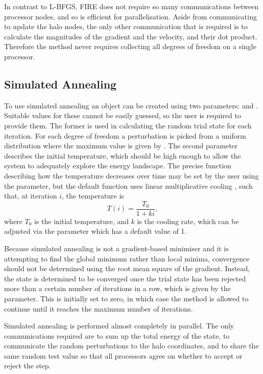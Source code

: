 In contrast to L-BFGS, FIRE does not require so many communications between processor nodes, and so is efficient for parallelisation.
Aside from communicating to update the halo nodes, the only other communication that is required is to calculate the magnitudes of the gradient and the velocity, and their dot product.
Therefore the method never requires collecting all degrees of freedom on a single processor.

\subsection{Simulated Annealing}
To use simulated annealing an  object can be created using two parameters:  and .
Suitable values for these cannot be easily guessed, so the user is required to provide them.
The former is used in calculating the random trial state for each iteration.
For each degree of freedom a perturbation is picked from a uniform distribution where the maximum value is given by .
The second parameter  describes the initial temperature, which should be high enough to allow the system to adequately explore the energy landscape.
The precise function describing how the temperature decreases over time may be set by the user using the  parameter, but the default function uses linear multiplicative cooling \cite{Junn2017}, such that, at iteration $i$, the temperature is
\begin{equation}
  T(i) = \frac{T_0}{1 + ki},
\end{equation}
where $T_0$ is the initial temperature, and $k$ is the cooling rate, which can be adjusted via the parameter  which has a default value of 1.

Because simulated annealing is not a gradient-based minimiser and it is attempting to find the global minimum rather than local minima, convergence should not be determined using the root mean square of the gradient.
Instead, the state is determined to be converged once the trial state has been rejected more than a certain number of iterations in a row, which is given by the  parameter.
This is initially set to zero, in which case the method is allowed to continue until it reaches the maximum number of iterations.

Simulated annealing is performed almost completely in parallel.
The only communications required are to sum up the total energy of the state, to communicate the random perturbations to the halo coordinates, and to share the same random test value so that all processors agree on whether to accept or reject the step.



